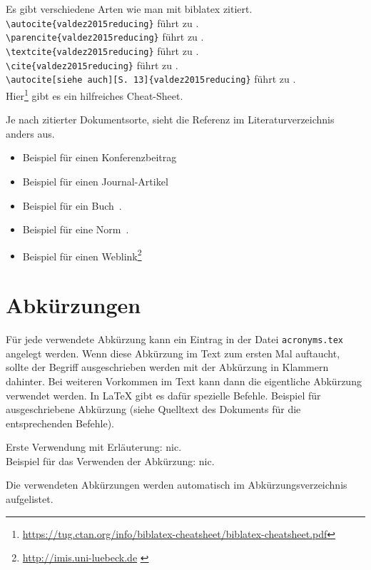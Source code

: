 Es gibt verschiedene Arten wie man mit biblatex zitiert.\\
\noindent
\texttt{\textbackslash autocite\{valdez2015reducing\}} führt zu \autocite{valdez2015reducing}.\\
\texttt{\textbackslash parencite\{valdez2015reducing\}} führt zu \parencite{valdez2015reducing}.\\
\texttt{\textbackslash textcite\{valdez2015reducing\}} führt zu \textcite{valdez2015reducing}.\\
\texttt{\textbackslash cite\{valdez2015reducing\}} führt zu \cite{valdez2015reducing}.\\
\texttt{\textbackslash autocite[siehe auch][S. 13]\{valdez2015reducing\}} führt zu \autocite[siehe auch][S.~13]{valdez2015reducing}.\\

Hier\footnote{\url{https://tug.ctan.org/info/biblatex-cheatsheet/biblatex-cheatsheet.pdf}} gibt es ein hilfreiches Cheat-Sheet.

Je nach zitierter Dokumentsorte, sieht die Referenz im Literaturverzeichnis anders aus.
\begin{itemize}
    \item Beispiel für einen Konferenzbeitrag \autocite{Nielsen1990}
    \item Beispiel für einen Journal-Artikel \autocite{hollan2000}
    \item Beispiel für ein Buch~\autocite{zobel2014writing}.
    \item Beispiel für eine Norm~\autocite{ISO9241}.
    \item Beispiel für einen Weblink\footnote{{\url{http://imis.uni-luebeck.de}} \autocite{webimis}}

\end{itemize}


\section{Abkürzungen}
Für jede verwendete Abkürzung kann ein Eintrag in der Datei \texttt{acronyms.tex} angelegt werden. Wenn diese Abkürzung im Text zum ersten Mal auftaucht, sollte der Begriff ausgeschrieben werden mit der Abkürzung in Klammern dahinter. Bei weiteren Vorkommen im Text kann dann die eigentliche Abkürzung verwendet werden. In \LaTeX{} gibt es dafür spezielle Befehle. Beispiel für ausgeschriebene Abkürzung (siehe Quelltext des Dokuments für die entsprechenden Befehle).

Erste Verwendung mit Erläuterung: \acrfull{nic}.\\ 
Beispiel für das Verwenden der Abkürzung: \acrshort{nic}. 

Die verwendeten Abkürzungen werden automatisch im Abkürzungsverzeichnis aufgelistet.


